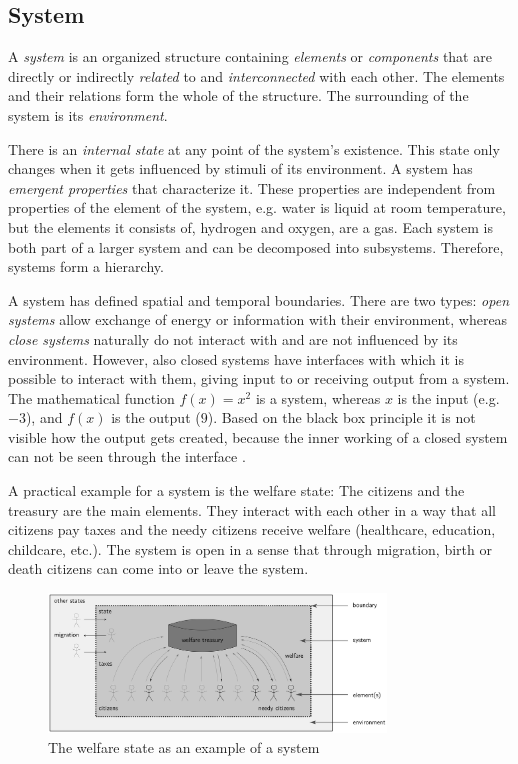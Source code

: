 

\subsection{System} %
\label{sub:system}

A \emph{system} is an organized structure containing \emph{elements} or \emph{components} that are directly or indirectly \emph{related} to and \emph{interconnected} with each other. The elements and their relations form the whole of the structure. The surrounding of the system is its \emph{environment}.

There is an \emph{internal state} at any point of the system's existence. This state only changes when it gets influenced by stimuli of its environment. A system has \emph{emergent properties} that characterize it. These properties are independent from properties of the element of the system, e.g. water is liquid at room temperature, but the elements it consists of, hydrogen and oxygen, are a gas. Each system is both part of a larger system and can be decomposed into subsystems. Therefore, systems form a hierarchy.

A system has defined spatial and temporal boundaries. There are two types: \emph{open systems} allow exchange of energy or information with their environment, whereas \emph{close systems} naturally do not interact with and are not influenced by its environment. However, also closed systems have interfaces with which it is possible to interact with them, giving input to or receiving output from a system. The mathematical function $f(x) = x^2$ is a system, whereas $x$ is the input (e.g. $-3$), and $f(x)$ is the output ($9$). Based on the black box principle it is not visible how the output gets created, because the inner working of a closed system can not be seen through the interface
\cite{system}.

A practical example for a system is the welfare state: The citizens and the treasury are the main elements. They interact with each other in a way that all citizens pay taxes and the needy citizens receive welfare (healthcare, education, childcare, etc.). The system is open in a sense that through migration, birth or death citizens can come into or leave the system.

\begin{figure}[ht]
  \centering
  \includegraphics[width = 0.8\textwidth]{graphics/basics/social_system}
  \caption{The welfare state as an example of a system}
  \label{fig:social_system}
\end{figure}


